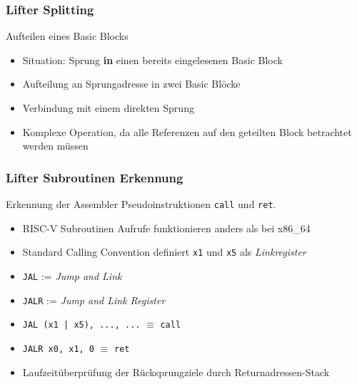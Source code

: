 \begin{frame}
    \frametitle{Lifter Splitting}{Aufteilen eines Basic Blocks}
    \begin{itemize}
        \setlength{\itemsep}{1em}
        \item Situation: Sprung \textbf{in} einen bereits eingelesenen Basic Block
        \item Aufteilung an Sprungadresse in zwei Basic Blöcke
        \item Verbindung mit einem direkten Sprung
        \item Komplexe Operation, da alle Referenzen auf den geteilten Block betrachtet werden müssen
    \end{itemize}
\end{frame}
\clearpage

\begin{frame}
    \frametitle{Lifter Subroutinen Erkennung}{Erkennung der Assembler Pseudoinstruktionen \texttt{call} und \texttt{ret}.}
    \begin{itemize}
        \setlength{\itemsep}{0.8em}
        \item RISC-V Subroutinen Aufrufe funktionieren anders als bei x86\_64
        \item Standard Calling Convention definiert \texttt{x1} und \texttt{x5} als \textit{Linkregister}
        \item \texttt{JAL} := \textit{Jump and Link}
        \item \texttt{JALR} := \textit{Jump and Link Register}
        \item \texttt{JAL (x1 | x5), ..., ...} $\equiv$ \texttt{call}
        \item \texttt{JALR x0, x1, 0} $\equiv$ \texttt{ret}
        \item Laufzeitüberprüfung der Rücksprungziele durch Returnadressen-Stack
    \end{itemize}
\end{frame}
\clearpage

